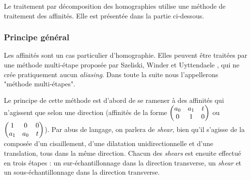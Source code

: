 Le traitement par décomposition des homographies utilise une méthode de traitement des affinités. Elle est présentée dans la partie ci-dessous.
\subsubsection{Principe général}
	
	Les affinités sont un cas particulier d'homographie. Elles peuvent être traitées par une méthode multi-étape proposée par Szeliski, Winder et Uyttendaele \cite{szeliski2010high}, qui ne crée pratiquement aucun \emph{aliasing}. Dans toute la suite nous l'appellerons "méthode multi-étapes".%

	Le principe de cette méthode est d'abord de se ramener à des affinités qui n'agissent que selon une direction (affinités de la forme $\begin{pmatrix} a_0 & a_1 & t\\ 0 & 1 & 0 \end{pmatrix}$ ou $\begin{pmatrix} 1 & 0 & 0\\ a_1 & a_0 & t \end{pmatrix}$). Par abus de langage, on parlera de \emph{shear}, bien qu'il s'agisse de la composée d'un cisaillement, d'une dilatation unidirectionnelle et d'une translation, tous dans la même direction. Chacun des \emph{shears} est ensuite effectué en trois étapes : un sur-échantillonnage dans la direction transverse, un \emph{shear} et un sous-échantillonnage dans la direction transverse. 
	
